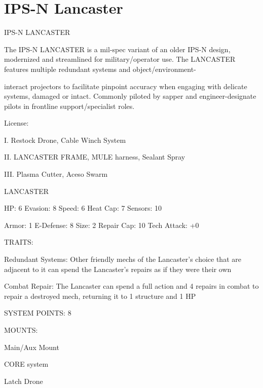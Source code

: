 \section{IPS-N Lancaster}

                                         IPS-N LANCASTER

The IPS-N LANCASTER is a mil-spec variant of an older IPS-N design, modernized and streamlined for
military/operator use. The LANCASTER features multiple redundant systems and object/environment-

interact projectors to facilitate pinpoint accuracy when engaging with delicate systems, damaged or intact.
Commonly piloted by sapper and engineer-designate pilots in frontline support/specialist roles.


                                                   License:

I. Restock Drone, Cable Winch System

II. LANCASTER FRAME, MULE harness, Sealant Spray

III. Plasma Cutter, Aceso Swarm


                                                LANCASTER

  HP: 6          Evasion: 8                            Speed: 6           Heat Cap: 7        Sensors: 10

  Armor: 1       E-Defense: 8                          Size: 2            Repair Cap: 10     Tech Attack:
                                                                                             +0

                                                   TRAITS:

  Redundant Systems: Other friendly mechs of the Lancaster’s choice that are adjacent to it can spend
  the Lancaster’s repairs as if they were their own

  Combat Repair: The Lancaster can spend a full action and 4 repairs in combat to repair a destroyed
  mech, returning it to 1 structure and 1 HP

                                             SYSTEM POINTS: 8

                                                   MOUNTS:

  Main/Aux Mount

                                                CORE system




                                                      Latch Drone

